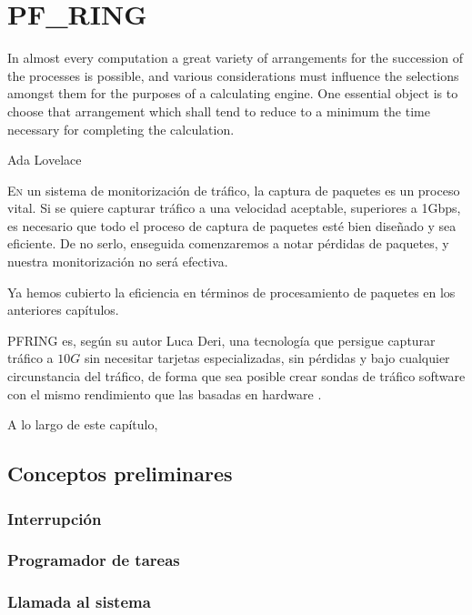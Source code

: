 \chapter{PF\_RING}
\pagestyle{esitscCD}

\epigraph{In almost every computation a great variety of arrangements for the succession of the processes is possible, 
and various considerations must influence the selections amongst them for the purposes of a calculating engine. One 
essential object is to choose that arrangement which shall tend to reduce to a minimum the time necessary for completing 
the calculation.}{Ada Lovelace}

\lettrine[lraise=-0.1, lines=2, loversize=0.25]{E}n un sistema de monitorización de tráfico, la captura de paquetes es 
un proceso vital. Si se quiere capturar tráfico a una velocidad aceptable, superiores a 1Gbps, es necesario que todo el 
proceso de captura de paquetes esté bien diseñado y sea eficiente. De no serlo, enseguida comenzaremos a notar 
pérdidas de paquetes, y nuestra monitorización no será efectiva.

Ya hemos cubierto la eficiencia en términos de procesamiento de paquetes en los anteriores capítulos. 

\gls{PFRING} es, según su autor Luca Deri, una tecnología que persigue capturar tráfico a $10G$ sin necesitar tarjetas 
especializadas, sin pérdidas y bajo cualquier circunstancia del tráfico, de forma que sea posible crear sondas de 
tráfico software con el mismo rendimiento que las basadas en hardware \cite{LucaDeriPFRING}.

A lo largo de este capítulo, %

\section{Conceptos preliminares}
\subsection{Interrupción}
\subsection{Programador de tareas}
\subsection{Llamada al sistema}
